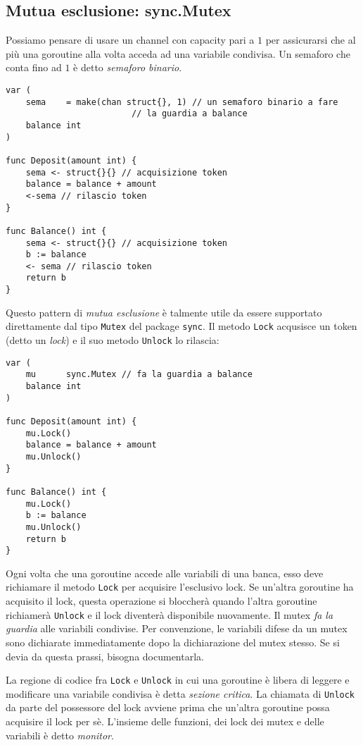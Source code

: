 \documentclass[../../thesis.tex]{subfiles}
\begin{document}
    \subsection{Mutua esclusione: sync.Mutex}\label{subsec:mutua-esclusione:-sync.mutex}
    Possiamo pensare di usare un channel con capacity pari a $1$ per assicurarsi che al più una goroutine alla volta acceda ad una variabile condivisa.
    Un semaforo che conta fino ad $1$ è detto \textit{semaforo binario}.
    \begin{lstlisting}[frame = single,label={lst:lstlisting9-2.1}]
var (
    sema    = make(chan struct{}, 1) // un semaforo binario a fare
    				     // la guardia a balance
    balance int
)

func Deposit(amount int) {
    sema <- struct{}{} // acquisizione token
    balance = balance + amount
    <-sema // rilascio token
}

func Balance() int {
    sema <- struct{}{} // acquisizione token
    b := balance
    <- sema // rilascio token
    return b
}
    \end{lstlisting}
    Questo pattern di \textit{mutua esclusione} è talmente utile da essere supportato direttamente dal tipo \verb"Mutex" del package \verb"sync".
    Il metodo \verb"Lock" acqusisce un token (detto un \textit{lock}) e il suo metodo \verb"Unlock" lo rilascia:
    \begin{lstlisting}[frame = single,label={lst:lstlisting9-2.2}]
var (
    mu      sync.Mutex // fa la guardia a balance
    balance int
)

func Deposit(amount int) {
    mu.Lock()
    balance = balance + amount
    mu.Unlock()
}

func Balance() int {
    mu.Lock()
    b := balance
    mu.Unlock()
    return b
}
    \end{lstlisting}
    Ogni volta che una goroutine accede alle variabili di una banca, esso deve richiamare il metodo \verb"Lock" per acquisire l'esclusivo lock.
    Se un'altra goroutine ha acquisito il lock, questa operazione si bloccherà quando l'altra goroutine richiamerà \verb"Unlock" e il lock diventerà disponibile nuovamente.
    Il mutex \textit{fa la guardia} alle variabili condivise.
    Per convenzione, le variabili difese da un mutex sono dichiarate immediatamente dopo la dichiarazione del mutex stesso.
    Se si devia da questa prassi, bisogna documentarla.
    \hfill \vspace{12pt}

    La regione di codice fra \verb"Lock" e \verb"Unlock" in cui una goroutine è libera di leggere e modificare una variabile condivisa è detta \textit{sezione critica}.
    La chiamata di \verb"Unlock" da parte del possessore del lock avviene prima che un'altra goroutine possa acquisire il lock per sè.
    L'insieme delle funzioni, dei lock dei mutex e delle variabili è detto \textit{monitor}.
    \hfill \vspace{12pt}
\end{document}
